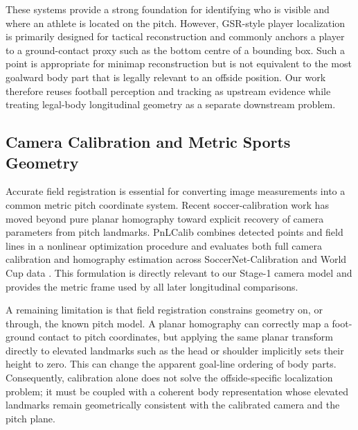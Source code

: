 \documentclass[runningheads]{llncs}
\begin{document}
These systems provide a strong foundation for identifying who is visible and where an athlete is located on the pitch. However, GSR-style player localization is primarily designed for tactical reconstruction and commonly anchors a player to a ground-contact proxy such as the bottom centre of a bounding box. Such a point is appropriate for minimap reconstruction but is not equivalent to the most goalward body part that is legally relevant to an offside position. Our work therefore reuses football perception and tracking as upstream evidence while treating legal-body longitudinal geometry as a separate downstream problem.

\subsection{Camera Calibration and Metric Sports Geometry}
Accurate field registration is essential for converting image measurements into a common metric pitch coordinate system. Recent soccer-calibration work has moved beyond pure planar homography toward explicit recovery of camera parameters from pitch landmarks. PnLCalib combines detected points and field lines in a nonlinear optimization procedure and evaluates both full camera calibration and homography estimation across SoccerNet-Calibration and World Cup data \cite{pnlcalib}. This formulation is directly relevant to our Stage-1 camera model and provides the metric frame used by all later longitudinal comparisons.

A remaining limitation is that field registration constrains geometry on, or through, the known pitch model. A planar homography can correctly map a foot-ground contact to pitch coordinates, but applying the same planar transform directly to elevated landmarks such as the head or shoulder implicitly sets their height to zero. This can change the apparent goal-line ordering of body parts. Consequently, calibration alone does not solve the offside-specific localization problem; it must be coupled with a coherent body representation whose elevated landmarks remain geometrically consistent with the calibrated camera and the pitch plane.
\end{document}
